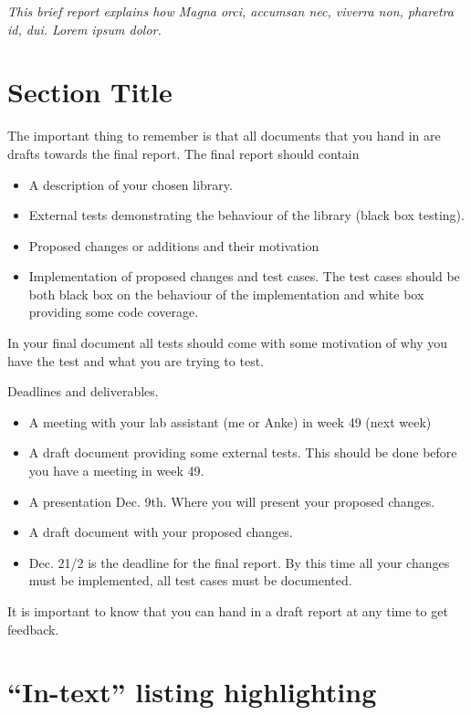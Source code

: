 \textit{This brief report explains how Magna orci, accumsan nec, viverra non, pharetra id, dui.  Lorem ipsum dolor.  }
\section{Section Title}

The important thing to remember is that all documents that you hand in are drafts towards the final report. The final report should contain

\begin{itemize}
    \item A description of your chosen library.
    \item External tests demonstrating the behaviour of the library (black box testing).
    \item Proposed changes or additions and their motivation
    \item Implementation of proposed changes and test cases. The test cases should be both black box on the behaviour of the implementation and white box providing some code coverage.
\end{itemize}

In your final document all tests should come with some motivation of why you
have the test and what you are trying to test.

Deadlines and deliverables.

\begin{itemize}
    \item A meeting with your lab assistant (me or Anke) in week 49 (next week)
    \item A draft document providing some external tests. This should be done before  you have a meeting in week 49.
    \item A presentation Dec. 9th. Where you will present your proposed changes.
    \item A draft document with your proposed changes.
    \item Dec. 21/2 is the deadline for the final report. By this time all your changes must be implemented, all test cases must be documented.
\end{itemize}
It is important to know that you can hand in a draft report at any
time to get feedback.


\section{``In-text'' listing highlighting}

